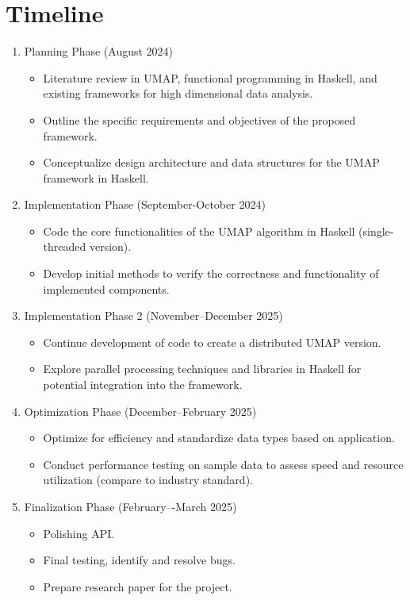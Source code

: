 \documentclass[11pt,letterpaper]{article}
\begin{document}
\section{Timeline}
\begin{enumerate}
    \item Planning Phase (August 2024)
\begin{itemize}
    \item Literature review in UMAP, functional programming in Haskell, and existing frameworks for high dimensional data analysis.
    \item Outline the specific requirements and objectives of the proposed framework.
    \item Conceptualize design architecture and data structures for the UMAP framework in Haskell.
\end{itemize}
\item Implementation Phase (September-October 2024)
\begin{itemize}
    \item Code the core functionalities of the UMAP algorithm in Haskell (single-threaded version).
    \item Develop initial methods to verify the correctness and functionality of implemented components.
\end{itemize}
\item Implementation Phase 2 (November--December 2025)
\begin{itemize}
    \item Continue development of code to create a distributed UMAP version.
    \item Explore parallel processing techniques and libraries in Haskell for potential integration into the framework.
\end{itemize}
\item Optimization Phase (December--February 2025)
\begin{itemize}
    \item Optimize for efficiency and standardize data types based on application.
    \item Conduct performance testing on sample data to assess speed and resource utilization (compare to industry standard).
\end{itemize}
\item Finalization Phase (February–-March 2025)
\begin{itemize}
    \item Polishing API.
    \item Final testing, identify and resolve bugs.
    \item Prepare research paper for the project.
\end{itemize}
\end{enumerate}
\end{document}
